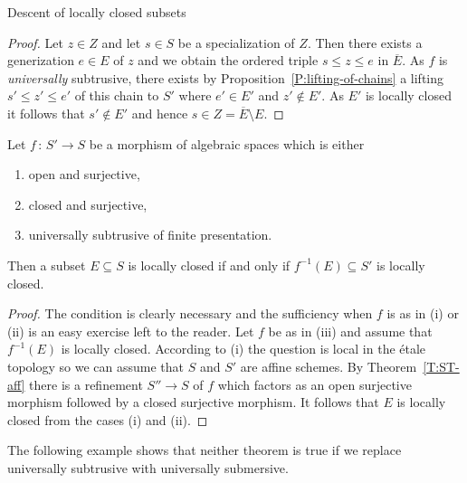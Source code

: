\documentclass[a4paper,twoside,11pt]{amsart}[2009/07/02] %
\newcommand{\pref}[1]{\eqref{#1}}
\newcommand{\map}[3]{#1\,:\, #2\rightarrow #3}
\newcommand{\etale}{\'{e}tale}
\begin{document}
\begin{section}{Descent of locally closed subsets}
\begin{proof}
Let $z\in Z$ and let $s\in S$ be a specialization of $Z$. Then there exists a
generization $e\in E$ of $z$ and we obtain the ordered triple $s\leq z\leq
e$ in $\overline{E}$. As $f$ is \emph{universally} subtrusive, there exists by
Proposition~\pref{P:lifting-of-chains} a lifting $s'\leq z'\leq e'$ of this
chain to $S'$ where $e'\in E'$ and $z'\notin E'$. As $E'$ is locally closed it
follows that $s'\notin E'$ and hence $s\in Z=\overline{E}\setminus E$.
\end{proof}

\begin{theorem}\label{T:loc-closed-2}
Let $\map{f}{S'}{S}$ be a morphism of algebraic spaces which is either
%
\begin{enumerate}
\item open and surjective,
\item closed and surjective,
\item universally subtrusive of finite presentation.
\end{enumerate}
%
Then a subset $E\subseteq S$ is locally closed if and only if
$f^{-1}(E)\subseteq S'$ is locally closed.
\end{theorem}
\begin{proof}
The condition is clearly necessary and the sufficiency when $f$ is as in (i)
or (ii) is an easy exercise left to the reader.
%
%
Let $f$ be as in (iii)
%
and assume that
$f^{-1}(E)$ is locally closed.
%
According to (i) the question is local in the \etale{} topology so we
can assume that $S$ and $S'$ are affine schemes.
%
By Theorem~\pref{T:ST-aff} there is a refinement $S''\to S$ of $f$ which
factors as an open surjective morphism followed by a closed surjective
morphism. It follows that $E$ is locally closed from
%
the cases (i) and (ii).
\end{proof}


The following example shows that neither theorem is true if we replace
universally subtrusive with universally submersive.


\end{section}
\end{document}
